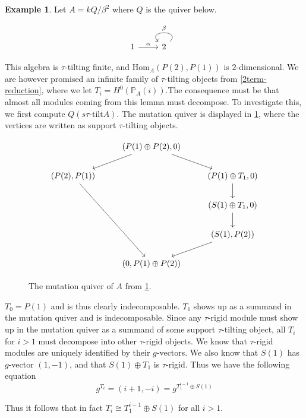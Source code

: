\documentclass[]{article}
\theoremstyle{definition}
\newtheorem{example}{Example}[section]
\newcommand{\tu}{\ensuremath{\tau}}
\begin{document}
\begin{example}\label{example-decomposing-modules}
	Let $A = kQ/\beta^2$ where $Q$ is the quiver below.
	
	\[
	\begin{tikzcd}
		1 & 2
		\arrow[from=1-1,to=1-2,"\alpha"]
		\arrow[loop,from = 1-2,to=1-2,"\beta"',distance=2em]
	\end{tikzcd}
	\]
	
	This algebra is $\tu$-tilting finite, and $\text{Hom}_A(P(2),P(1))$ is $2$-dimensional. We are however promised an infinite family of $\tu$-tilting objects from \cref{2term-reduction}, where we let $T_i = H^0(\mathbb{P}_A(i))$.The consequence must be that almost all modules coming from this lemma must decompose. To investigate this, we first compute $Q(s\tau\text{-tilt} A)$. The mutation quiver is displayed in \cref{mutation-quiver-example-decomposing-modules}, where the vertices are written as support \tu-tilting objects.
	
	\begin{figure}[h]
		\[\begin{tikzcd}
		& {(P(1)\oplus P(2),0)} \\
		{(P(2),P(1))} && {(P(1) \oplus T_1,0)} \\
		&& {(S(1)\oplus T_1,0)} \\
		&& {(S(1),P(2))} \\
		& {(0,P(1)\oplus P(2))}
		\arrow[from=1-2, to=2-1]
		\arrow[from=1-2, to=2-3]
		\arrow[from=2-3, to=3-3]
		\arrow[from=3-3, to=4-3]
		\arrow[from=4-3, to=5-2]
		\arrow[from=2-1, to=5-2]
	\end{tikzcd}\]
\caption{The mutation quiver of $A$ from \cref{example-decomposing-modules}.}
\label{mutation-quiver-example-decomposing-modules}
	\end{figure}

	
	$T_0 = P(1)$ and is thus clearly indecomposable. $T_1$ shows up as a summand in the mutation quiver and is indecomposable. Since any \tu-rigid module must show up in the mutation quiver as a summand of some support \tu-tilting object, all $T_i$ for $i > 1$ must decompose into other \tu-rigid objects. We know that \tu-rigid modules are uniquely identified by their $g$-vectors. We also know that $S(1)$ has $g$-vector $(1,-1)$, and that $S(1) \oplus T_1$ is \tu-rigid. Thus we have the following equation 
	\[g^{T_i} = (i+1,-i) = g^{T_1^{i-1} \oplus S(1)}\]
	
	Thus it follows that in fact $T_i \cong T_1^{i-1} \oplus S(1)$ for all $i > 1$.
\end{example}
\end{document}
